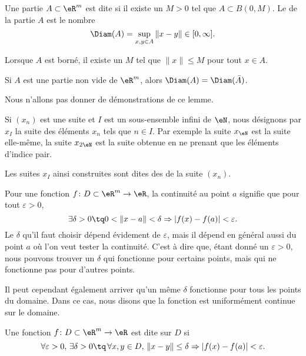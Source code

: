 \begin{definition}
	Une partie $A\subset\eR^m$ est dite  si il existe un $M>0$ tel que $A\subset B(0,M)$. Le  de la partie $A$ est le nombre
	\begin{equation}
		\Diam(A)=\sup_{x,y\in A}\| x-y \|\in\mathopen[ 0 , \infty \mathclose].
	\end{equation}
\end{definition}
Lorsque $A$ est borné, il existe un $M$ tel que $\| x \|\leq M$ pour tout $x\in A$.

\begin{lemma}
	Si $A$ est une partie non vide de $\eR^m$, alors $\Diam(A)=\Diam(\bar A)$.
\end{lemma}
Nous n'allons pas donner de démonstrations de ce lemme.


Si $(x_n)$ est une suite et $I$ est un sous-ensemble infini de $\eN$, nous désignons par $x_I$ la suite des éléments $x_n$ tels que $n\in I$. Par exemple la suite $x_{\eN}$ est la suite elle-même, la suite $x_{2\eN}$ est la suite obtenue en ne prenant que les éléments d'indice pair.

Les suites $x_I$ ainsi construites sont dites des  de la suite $(x_n)$.


Pour une fonction $f\colon D\subset\eR^m\to \eR$, la continuité au point $a$ signifie que pour tout $\varepsilon>0$,
\begin{equation}
	\exists\delta>0\tq 0<\| x-a \|<\delta\Rightarrow | f(x)-f(a) |<\varepsilon.
\end{equation}
Le $\delta$ qu'il faut choisir dépend évidement de $\varepsilon$, mais il dépend en général aussi du point $a$ où l'on veut tester la continuité. C'est à dire que, étant donné un $\varepsilon>0$, nous pouvons trouver un $\delta$ qui fonctionne pour certains points, mais qui ne fonctionne pas pour d'autres points.

Il peut cependant également arriver qu'un même $\delta$ fonctionne pour tous les points du domaine. Dans ce cas, nous disons que la fonction est uniformément continue sur le domaine.

\begin{definition}
	Une fonction $f\colon D\subset\eR^m\to \eR$ est dite  sur $D$ si
	\begin{equation}	\label{EqConditionUnifCont}
		\forall\varepsilon>0,\,\exists\delta>0\tq\,\forall x,y\in D,\,\| x-y \|\leq\delta \Rightarrow| f(x)-f(a) |<\varepsilon.
	\end{equation}
\end{definition}

